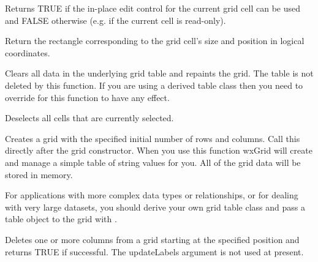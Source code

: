 
Returns TRUE if the in-place edit control for the current grid cell can be used and
FALSE otherwise (e.g. if the current cell is read-only).

\label{wxgridcelltorect}



Return the rectangle corresponding to the grid cell's size and position in logical
coordinates.

\label{wxgridcleargrid}


Clears all data in the underlying grid table and repaints the grid. The table is not deleted by
this function. If you are using a derived table class then you need to override 
 for this function to have any effect.

\label{wxgridclearselection}


Deselects all cells that are currently selected.

\label{wxgridcreategrid}


Creates a grid with the specified initial number of rows and columns.
Call this directly after the grid constructor. When you use this
function wxGrid will create and manage a simple table of string values
for you. All of the grid data will be stored in memory.

For applications with more complex data types or relationships, or for
dealing with very large datasets, you should derive your own grid table
class and pass a table object to the grid with . 

\label{wxgriddeletecols}


Deletes one or more columns from a grid starting at the specified position and returns
TRUE if successful. The updateLabels argument is not used at present.

